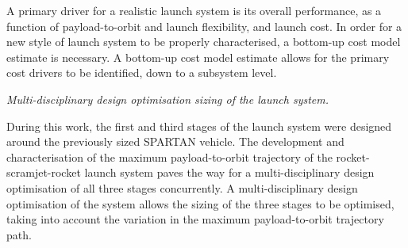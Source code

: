  \noindent
A primary driver for a realistic launch system is its overall performance, as a function of payload-to-orbit and launch flexibility, and launch cost. In order for a new style of launch system to be properly characterised, a bottom-up cost model estimate is necessary. A bottom-up cost model estimate allows for the primary cost drivers to be identified, down to a subsystem level. 

\vspace{10pt}
 \textit{Multi-disciplinary design optimisation sizing of the launch system.}

 \noindent
During this work, the first and third stages of the launch system were designed around the previously sized SPARTAN vehicle.
The development and characterisation of the maximum payload-to-orbit trajectory of the rocket-scramjet-rocket launch system paves the way for a multi-disciplinary design optimisation of all three stages concurrently. A multi-disciplinary design optimisation of the system allows the sizing of the three stages to be optimised, taking into account the variation in the maximum payload-to-orbit trajectory path.  






